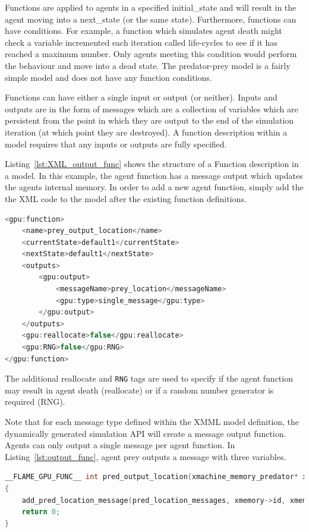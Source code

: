 Functions are applied to agents in a specified initial\_state and will result in the agent moving into a next\_state (or the same state). Furthermore, functions can have conditions. For example, a function which simulates agent death might check a variable incremented each iteration called life-cycles to see if it has reached a maximum number. Only agents meeting this condition would perform the behaviour and move into a dead state.  The predator-prey model is a fairly simple model and does not have any function conditions.

Functions can have either a single input or output (or neither). Inputs and outputs are in the form of messages which are a collection of variables which are persistent from the point in which they are output to the end of the simulation iteration (at which point they are destroyed).  A function description within a model requires that any inputs or outputs are fully specified. 



Listing~\ref{lst:XML_output_func} shows the structure of a Function description in a model. In this example, the agent function has a message output which updates the agents internal memory. In order to add a new agent function, simply add the the XML code to the model after the existing function definitions.


\begin{lstlisting}[linewidth=\columnwidth,breaklines=true,language=C++,caption={},label=lst:XML_output_func]
<gpu:function>
    <name>prey_output_location</name>
    <currentState>default1</currentState>
    <nextState>default1</nextState>
    <outputs>
        <gpu:output>
            <messageName>prey_location</messageName>
            <gpu:type>single_message</gpu:type>
        </gpu:output>
    </outputs>
    <gpu:reallocate>false</gpu:reallocate>
    <gpu:RNG>false</gpu:RNG>
</gpu:function>
\end{lstlisting}

The additional reallocate and \verb|RNG| tags are used to specify if the agent function may result in agent death (reallocate) or if a random number generator is required (RNG). 

Note that for each message type defined within the XMML model definition, the dynamically generated simulation API will create a message output function. Agents can only output a single message per agent function. In Listing~\ref{lst:output_func}, agent prey outputs a message with three variables.

\begin{lstlisting}[linewidth=\columnwidth,breaklines=true,language=C++,caption={},label=lst:output_func]
__FLAME_GPU_FUNC__ int pred_output_location(xmachine_memory_predator* xmemory, xmachine_message_pred_location_list* pred_location_messages)
{
	add_pred_location_message(pred_location_messages, xmemory->id, xmemory->x, xmemory->y);
	return 0;
}
\end{lstlisting}


